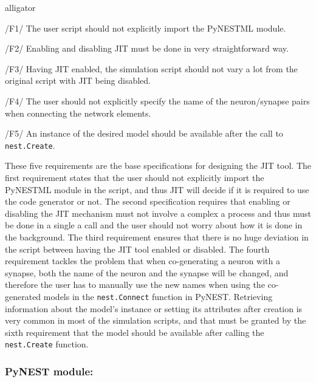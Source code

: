 \begin{labeling}{alligator}
   \item  [/F1/] The user script should not explicitly import the PyNESTML module. \\
   
     
   \item [/F2/] Enabling and disabling JIT must be done in very straightforward way.\\
   
   \item  [/F3/] Having JIT enabled, the simulation script should not vary a lot from the original script with JIT being disabled.\\
 
   \item  [/F4/]\label{req:F4} The user should not explicitly specify the name of the neuron/synapse pairs when connecting the network elements.\\
   
   \item  [/F5/] An instance of the desired model should be available after the call to \texttt{nest.Create}.\\
   
\end{labeling}

These five requirements are the base specifications for designing the JIT tool. The first requirement states that the user should not explicitly import the PyNESTML module in the script, and thus JIT will decide if it is required to use the code generator or not. The second specification requires that enabling or disabling the JIT mechanism must not involve a complex a process and thus must be done in a single a call and the user should not worry about how it is done in the background. The third requirement ensures that there is no huge deviation in the script between having the JIT tool enabled or disabled. The fourth requirement tackles the problem that when co-generating a neuron with a synapse, both the name of the neuron and the synapse will be changed, and therefore the user has to manually use the new names when using the co-generated models in the \texttt{nest.Connect} function in PyNEST. Retrieving information about the model's instance or setting its attributes after creation is very common in most of the simulation scripts, and that must be granted by the sixth requirement that the model should be available after calling the \texttt{nest.Create} function.

\subsubsection*{PyNEST module:}


